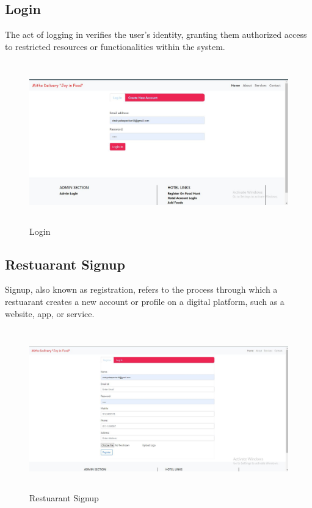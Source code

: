 \newpage
\subsection{Login}
The act of logging in verifies the user's identity, granting them authorized access to restricted resources or functionalities within the system.
\begin{figure}[h]
    \centering
    \includegraphics[height=7cm]{img/Graphics/login ui.JPG}
    \caption{Login}
\end{figure}

\subsection{Restuarant Signup}
Signup, also known as registration, refers to the process through which a restuarant creates a new account or profile on a digital platform, such as a website, app, or service. 
\begin{figure}[h]
    \centering
    \includegraphics[height=7cm]{img/Graphics/hotel sign up.JPG}
    \caption{Restuarant Signup}
\end{figure}

\newpage
